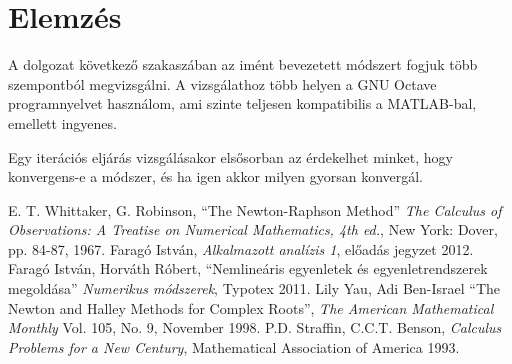 \documentclass[a4paper,12pt]{report}
\begin{document}
				
			\section{Elemzés}
				A dolgozat következő szakaszában az imént bevezetett módszert fogjuk több szempontból megvizsgálni. A vizsgálathoz több helyen a GNU Octave programnyelvet használom, ami szinte teljesen kompatibilis a MATLAB-bal, emellett ingyenes.
				
				Egy iterációs eljárás vizsgálásakor elsősorban az érdekelhet minket, hogy konvergens-e a módszer, és ha igen akkor milyen gyorsan konvergál. 
				
				




	\begin{thebibliography}{99}
    	 E. T. Whittaker, G. Robinson, ``The Newton-Raphson Method'' \emph{The Calculus of Observations: A Treatise on Numerical Mathematics, 4th ed.}, New York: Dover, pp. 84-87, 1967. 
		 Faragó István, \emph{Alkalmazott analízis 1}, előadás jegyzet 2012.
         Faragó István, Horváth Róbert, ``Nemlineáris egyenletek és egyenletrendszerek megoldása'' \emph{Numerikus módszerek}, Typotex 2011.
         Lily Yau, Adi Ben-Israel ``The Newton and Halley Methods for Complex Roots'', \emph{The American Mathematical Monthly} Vol. 105, No. 9, November 1998. %
		 P.D. Straffin, C.C.T. Benson, \emph{Calculus Problems for a New Century}, Mathematical Association of America 1993.

        
	\end{thebibliography}
\end{document}
